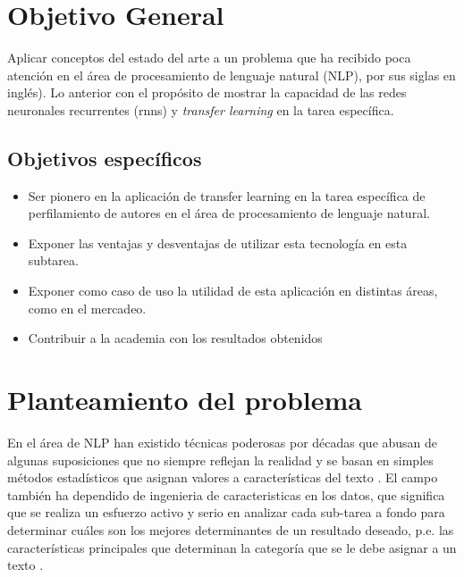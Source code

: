 
\section{Objetivo General}

Aplicar conceptos del estado del arte a un problema que ha recibido poca atención en el área de \gls{procesamiento de lenguaje natural} (NLP), por sus siglas en inglés). Lo anterior con el propósito de mostrar la capacidad de las redes neuronales recurrentes (\glspl{rnn}) y \textit{\gls{transfer learning}} en la tarea específica.

\subsection{Objetivos específicos}

\begin{itemize}
\item Ser pionero en la aplicación de transfer learning en la tarea específica de perfilamiento de autores en el área de procesamiento de lenguaje natural.
\item Exponer las ventajas y desventajas de utilizar esta tecnología en esta subtarea.
\item Exponer como caso de uso la utilidad de esta aplicación en distintas áreas, como en el mercadeo.
\item Contribuir a la academia con los resultados obtenidos
\end{itemize}


\section{Planteamiento del problema}

En el área de NLP han existido técnicas poderosas por décadas que abusan de algunas suposiciones que no siempre reflejan la realidad y se basan en simples métodos estadísticos que asignan valores a características del texto \parencite{Edmundson1969, kupiec1995trainable}. El campo también ha dependido de \gls{ingenieria de caracteristicas} en los datos, que significa que se realiza un esfuerzo activo y serio en analizar cada sub-tarea a fondo para determinar cuáles son los mejores determinantes de un resultado deseado, p.e. las características principales que determinan la categoría que se le debe asignar a un texto \parencite{aggarwal2012mining}.


